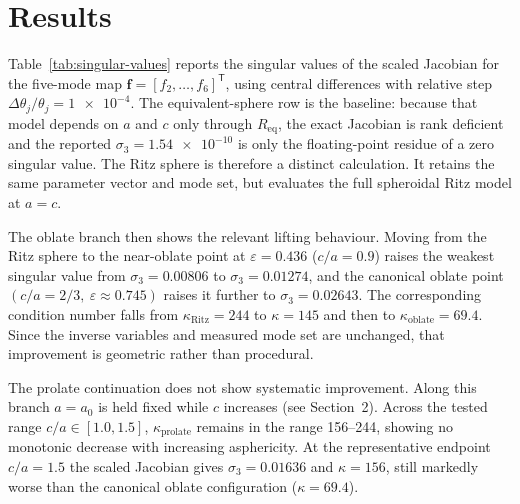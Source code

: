 \section{Results}

Table~\ref{tab:singular-values} reports the singular values of the scaled
Jacobian for the five-mode map
$\mathbf{f}=[f_2,\ldots,f_6]^\mathsf{T}$, using central differences with
relative step $\Delta\theta_j/\theta_j=\num{1e-4}$.  The equivalent-sphere row
is the baseline: because that model depends on $a$ and $c$ only through
$R_\mathrm{eq}$, the exact Jacobian is rank deficient and the reported
$\sigma_3=\num{1.54e-10}$ is only the floating-point residue of a zero singular
value.  The Ritz sphere is therefore a distinct calculation.  It retains the
same parameter vector and mode set, but evaluates the full spheroidal Ritz
model at $a=c$.

The oblate branch then shows the relevant lifting behaviour.  Moving from the
Ritz sphere to the near-oblate point at $\varepsilon=\num{0.436}$
($c/a=\num{0.9}$) raises the
weakest singular value from $\sigma_3=\num{0.00806}$ to
$\sigma_3=\num{0.01274}$, and the canonical oblate point
$(c/a=2/3,\ \varepsilon\approx\num{0.745})$ raises it further to
$\sigma_3=\num{0.02643}$.  The corresponding condition number falls from
$\kappa_\mathrm{Ritz}=244$ to $\kappa=145$ and then to
$\kappa_\mathrm{oblate}=\num{69.4}$.  Since the inverse variables and measured
mode set are unchanged, that improvement is geometric rather than procedural.

The prolate continuation does not show systematic improvement.  Along this
branch $a=a_0$ is held fixed while $c$ increases (see Section~2).  Across the tested
range $c/a\in[\num{1.0},\num{1.5}]$, $\kappa_\mathrm{prolate}$ remains in the
range 156--244, showing no monotonic decrease with increasing asphericity.  At
the representative endpoint $c/a=\num{1.5}$ the scaled Jacobian gives
$\sigma_3=\num{0.01636}$ and $\kappa=156$, still markedly worse than the
canonical oblate configuration ($\kappa=\num{69.4}$).

